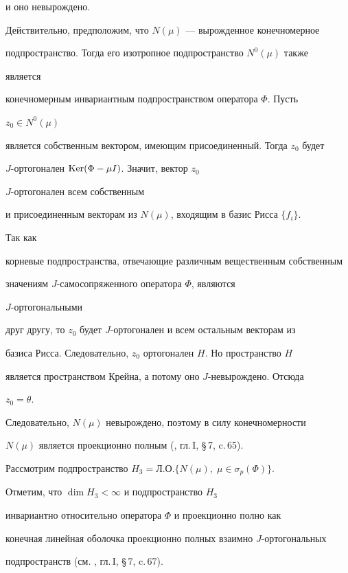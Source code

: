 и оно невырождено.





Действительно, предположим, что $N(\mu)$ --- вырожденное конечномерное


подпространство. Тогда его изотропное подпространство $N^0(\mu)$ также


является


конечномерным инвариантным подпространством оператора $\Phi$. Пусть


$z_0\in N^0(\mu)$


является собственным вектором, имеющим присоединенный. Тогда $z_0$ будет


$J$-ортогонален $\operatorname{Ker}(\Phi-\mu I)$. Значит, вектор $z_0\;$


$J$-ортогонален всем собственным


и присоединенным векторам из $N(\mu)$, входящим в базис Рисса $\{f_i\}$.


Так как


корневые подпространства, отвечающие различным вещественным собственным


значениям $J$-самосопряженного оператора $\Phi$, являются


$J$-ортогональными


друг другу, то $z_0$ будет $J$-ортогонален и всем остальным векторам из


базиса Рисса. Следовательно, $z_0$ ортогонален $H$. Но пространство $H$


является пространством Крейна, а потому оно $J$-невырождено. Отсюда


$z_0=\theta$.


Следовательно, $N(\mu)$ невырождено, поэтому в силу конечномерности


$N(\mu)$ является проекционно полным (\cite{Azi}, гл.\,I, \S\,7, c.\,65).





Рассмотрим подпространство $H_3=Л.О.\{N(\mu),\;\mu\in\sigma_p(\Phi)\}$.


Отметим, что $\dim H_3<\infty$ и подпространство $H_3$


инвариантно относительно оператора $\Phi$ и проекционно полно как


конечная линейная оболочка проекционно полных взаимно $J$-ортогональных


подпространств (см. \cite{Azi}, гл.\,I, \S\,7, c.\,67).





